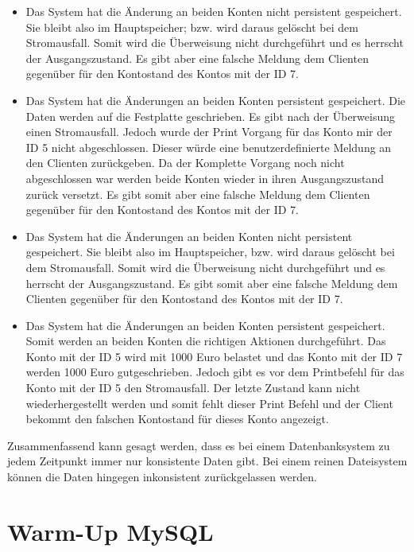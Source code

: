 \documentclass[ngerman]{gdb-aufgabenblatt}
\begin{document}
	\begin{itemize}
		\item Das System hat die Änderung an beiden Konten nicht persistent gespeichert. Sie bleibt also im Hauptspeicher; bzw. wird daraus gelöscht bei dem Stromausfall. Somit wird die Überweisung nicht durchgeführt und es herrscht der Ausgangszustand. Es gibt aber eine falsche Meldung  dem Clienten gegenüber für den Kontostand des Kontos mit der ID 7.
		
		\item Das System hat die Änderungen an beiden Konten persistent gespeichert. Die Daten werden auf die Festplatte geschrieben. Es gibt nach der Überweisung einen Stromausfall. Jedoch wurde der Print Vorgang für das Konto mir der ID 5 nicht abgeschlossen. Dieser würde eine benutzerdefinierte Meldung an den Clienten zurückgeben. Da der Komplette Vorgang noch nicht abgeschlossen war werden beide Konten wieder in ihren Ausgangszustand zurück versetzt. Es gibt somit aber eine falsche Meldung dem Clienten gegenüber für den Kontostand des Kontos mit der ID 7.
		
		\item Das System hat die Änderungen an beiden Konten nicht persistent gespeichert. Sie bleibt also im Hauptspeicher, bzw. wird daraus gelöscht bei dem Stromausfall. Somit wird die Überweisung nicht durchgeführt und es herrscht der Ausgangszustand. Es gibt somit aber eine falsche Meldung dem Clienten gegenüber für den Kontostand des Kontos mit der ID 7.
		
		\item Das System hat die Änderungen an beiden Konten persistent gespeichert. Somit werden an beiden Konten die richtigen Aktionen durchgeführt. Das Konto mit der ID 5 wird mit 1000 Euro belastet und das Konto mit der ID 7 werden 1000 Euro gutgeschrieben. Jedoch gibt es vor dem Printbefehl für das Konto mit der ID 5 den Stromausfall. Der letzte Zustand kann nicht wiederhergestellt werden und somit fehlt dieser Print Befehl und der Client bekommt den falschen Kontostand für dieses Konto angezeigt. 
	\end{itemize}	
	
	Zusammenfassend kann gesagt werden, dass es bei einem Datenbanksystem zu jedem Zeitpunkt immer nur konsistente Daten gibt.  Bei einem reinen Dateisystem können die Daten hingegen inkonsistent zurückgelassen werden.

\section{Warm-Up MySQL}
\end{document}
